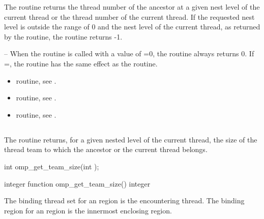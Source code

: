 \effect
The  routine returns the thread number of the 
ancestor at a given nest level of the current thread or the thread number of the current 
thread. If the requested nest level is outside the range of 0 and the nest level of the 
current thread, as returned by the  routine, the routine returns -1.

\notestart
\noteheader – When the  routine is called with a value 
of =0, the routine always returns 0. If =, the routine 
has the same effect as the  routine. 
\noteend

\crossreferences
\begin{itemize}
\item {} routine, see 
.

\item {} routine, see 
.

\item {} routine, see 
.
\end{itemize}










\subsection{}
\label{subsec:omp_get_team_size}
\summary
The  routine returns, for a given nested level of the current 
thread, the size of the thread team to which the ancestor or the current thread belongs. 

\format
\ccppspecificstart
\begin{boxedcode}
int omp\_get\_team\_size(int );
\end{boxedcode}
\ccppspecificend

\fortranspecificstart
\begin{boxedcode}
integer function omp\_get\_team\_size()
integer 
\end{boxedcode}
\fortranspecificend

\binding
The binding thread set for an  region is the encountering 
thread. The binding region for an  region is the innermost 
enclosing  region.

